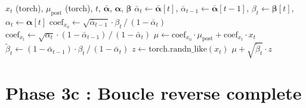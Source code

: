 \documentclass[12pt]{article}
\newcommand{\abar}{\bar{\alpha}}
\newcommand{\mupost}{\mu_{\mathrm{post}}}
\newcommand{\file}[1]{\texttt{\color{codeblue}#1}}
\newcommand{\func}[1]{\texttt{\color{codered}#1}}
\begin{document}
\begin{algorithm}[H]
\caption{Pas reverse DDPM --- \file{Reverse.py} $\to$ \func{reverse\_step\_ddpm}}
\begin{algorithmic}[1]
\Require $x_t$ (torch), $\mupost$ (torch), $t$, $\bar{\boldsymbol{\alpha}}$, $\boldsymbol{\alpha}$, $\boldsymbol{\beta}$
\State $\abar_t \gets \bar{\boldsymbol{\alpha}}[t]$, \quad $\abar_{t-1} \gets \bar{\boldsymbol{\alpha}}[t{-}1]$, \quad $\beta_t \gets \boldsymbol{\beta}[t]$, \quad $\alpha_t \gets \boldsymbol{\alpha}[t]$
\State $\text{coef}_{x_0} \gets \sqrt{\abar_{t-1}} \cdot \beta_t \,/\, (1-\abar_t)$
\State $\text{coef}_{x_t} \gets \sqrt{\alpha_t} \cdot (1-\abar_{t-1}) \,/\, (1-\abar_t)$
\State $\mu \gets \text{coef}_{x_0} \cdot \mupost + \text{coef}_{x_t} \cdot x_t$
\State $\tilde{\beta}_t \gets (1-\abar_{t-1}) \cdot \beta_t \,/\, (1-\abar_t)$
\State $z \gets \text{torch.randn\_like}(x_t)$
\Ensure $\mu + \sqrt{\tilde{\beta}_t} \cdot z$
\end{algorithmic}
\end{algorithm}

\section{Phase 3c : Boucle reverse complete}
\end{document}
